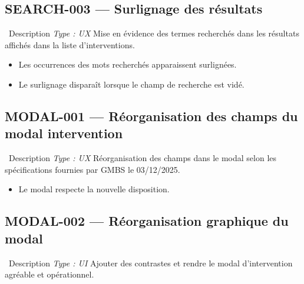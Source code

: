 \documentclass[12pt,a4paper]{article}
\newcommand{\checkmark}{\ding{51}}
\begin{document}
\subsection{SEARCH-003 — Surlignage des résultats}
\label{subsec:search-003}

\begin{featurebox}{\faMarker\ Description \hfill \textit{Type : UX}}
Mise en évidence des termes recherchés dans les résultats affichés dans la liste d'interventions.
\end{featurebox}

\begin{testbox}
\begin{itemize}[leftmargin=2em, itemsep=2pt]
    \item[\checkmark] Les occurrences des mots recherchés apparaissent surlignées.
    \item[\checkmark] Le surlignage disparaît lorsque le champ de recherche est vidé.
\end{itemize}
\end{testbox}

\subsection{MODAL-001 — Réorganisation des champs du modal intervention}
\label{subsec:modal-001}

\begin{featurebox}{\faCogs\ Description \hfill \textit{Type : UX}}
Réorganisation des champs dans le modal selon les spécifications fournies par GMBS le 03/12/2025.
\end{featurebox}

\begin{testbox}
\begin{itemize}[leftmargin=2em, itemsep=2pt]
    \item[\checkmark] Le modal respecte la nouvelle disposition.
\end{itemize}
\end{testbox}

\subsection{MODAL-002 — Réorganisation graphique du modal}
\label{subsec:modal-002}

\begin{featurebox}{\faPalette\ Description \hfill \textit{Type : UI}}
Ajouter des contrastes et rendre le modal d'intervention agréable et opérationnel.
\end{featurebox}
\end{document}
